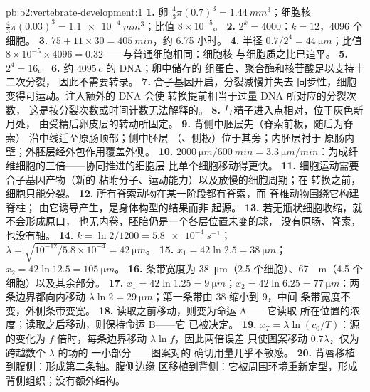 \begin{solution}{pb:b2:vertebrate-development:1}
\textbf{1.} 卵 $\tfrac43\pi(0.7)^{3} = \qty{1.44}{mm^3}$；细胞核
$\tfrac43\pi(0.03)^{3} = \qty{1.1e-4}{mm^3}$；比值 $8\times
10^{-5}$。
\textbf{2.} $2^{k} = 4000$：$k = 12$，4096 个细胞。
\textbf{3.} $75 + 11\times 30 = \qty{405}{min}$，约 6.75 小时。
\textbf{4.} 半径 $0.7/2^{4} = \qty{44}{\micro m}$；比值 $8\times
10^{-5}\times 4096 = 0.32$——与普通细胞相同：细胞核
与细胞质之比已追平。
\textbf{5.} $2^{4} = 16$。
\textbf{6.} 约 $4095\,c$ 的 DNA；卵中储存的
组蛋白、聚合酶和核苷酸足以支持十二次分裂，
因此不需要转录。
\textbf{7.} 合子基因开启，分裂减慢并失去
同步性，细胞变得可运动。注入额外的 DNA 会使
转换提前相当于过量 DNA 所对应的分裂次数，
这是按分裂次数或时间计数无法解释的。
\textbf{8.} 与精子进入点相对，位于灰色新月处，
由受精后卵皮层的转动所固定。
\textbf{9.} 背侧中胚层先（脊索前板，随后为脊索）
沿中线迁至原肠顶部；侧中胚层
（、侧板）位于其旁；内胚层衬于
原肠内壁；外胚层经外包作用覆盖外侧。
\textbf{10.} $\qty{2000}{\micro m}/\qty{600}{min} = \qty{3.3}{\micro
m/min}$：为成纤维细胞的三倍——协同推进的细胞层
比单个细胞移动得更快。
\textbf{11.} 细胞运动需要合子基因产物（新的
粘附分子、运动能力）以及放慢的细胞周期；在
转换之前，细胞只能分裂。
\textbf{12.} 所有脊索动物在某一阶段都有脊索，而
脊椎动物围绕它构建脊柱；
由它诱导产生，是身体构型的结果而非
起源。
\textbf{13.} 若无瓶状细胞收缩，就不会形成原口，
也无内卷，胚胎仍是一个各层位置未变的球，
没有原肠、脊索，也没有轴。
\textbf{14.} $k = \ln 2/1200 = \qty{5.8e-4}{s^{-1}}$；$\lambda =
\sqrt{10^{-12}/5.8\times 10^{-4}} = \qty{42}{\micro m}$。
\textbf{15.} $x_1 = 42\ln 2.5 = \qty{38}{\micro m}$；$x_2 = 42\ln 12.5
= \qty{105}{\micro m}$。
\textbf{16.} 条带宽度为 \qty{38}{\micro m}（2.5 个细胞）、\qty{67}{\micro
m}（4.5 个细胞）以及其余部分。
\textbf{17.} $x_1 = 42\ln 1.25 = \qty{9}{\micro m}$；$x_2 = 42\ln 6.25
= \qty{77}{\micro m}$：两条边界都向内移动 $\lambda\ln 2 =
\qty{29}{\micro m}$；第一条带由 38 缩小到 9，中间
条带宽度不变，外侧条带变宽。
\textbf{18.} 读取之前移动，则变为命运 A——它读取
所在位置的浓度；读取之后移动，则保持命运 B——它
已被决定。
\textbf{19.} $x_T = \lambda\ln(c_0/T)$：源的变化为
$f$ 倍时，每条边界移动 $\lambda\ln f$，因此两倍误差
只使图案移动 $0.7\lambda$，仅为跨越数个 $\lambda$ 的场的
一小部分——图案对的
确切用量几乎不敏感。
\textbf{20.} 背唇移植到腹侧：形成第二条轴。腹侧边缘
区移植到背侧：它被周围环境重新定型，形成
背侧组织；没有额外结构。

\end{solution}
